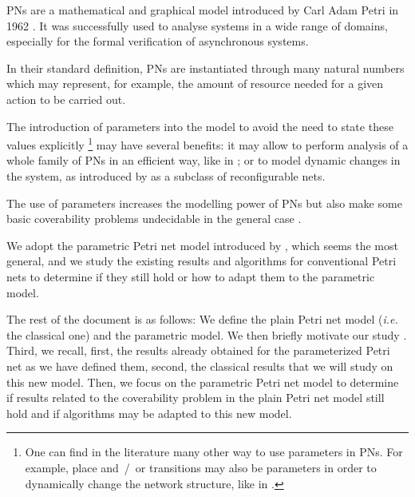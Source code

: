 \acp{PN} are a mathematical and graphical model introduced by Carl Adam Petri in 1962 \cite{Petri62}. It was successfully used to analyse systems in a wide range of domains, especially for the formal verification of asynchronous systems.

In their standard definition, \acp{PN} are instantiated through many natural numbers which may represent, for example, the amount of resource needed for a given action to be carried out.

The introduction of parameters into the model to avoid the need to state these values explicitly%
\footnote{One can find in the literature many other way to use parameters in \acp{PN}. For example, place and~/~or transitions may also be parameters in order to dynamically change the network structure, like in \cite{Christensen97}.}
may have several benefits:
it may allow to perform analysis of a whole family of \acp{PN} in an efficient way, like in \cite{Abdulla13}; or to model dynamic changes in the system, as introduced by \cite{Badouel99} as a subclass of reconfigurable nets.

The use of parameters increases the modelling power of \acp{PN} but also make some basic coverability problems undecidable in the general case \cite{David17}.

We adopt the parametric Petri net model introduced by \cite{David17}, which seems the most general, and we study the existing results and algorithms for conventional Petri nets to determine if they still hold or how to adapt them to the parametric model.

The rest of the document is as follows:
We define the plain Petri net model (\textit{i.e.} the classical one) and the parametric model.
We then briefly motivate our study .
Third, we recall, first, the results already obtained for the parameterized Petri net as we have defined them, second, the classical results that we will study on this new model.
Then, we focus on the parametric Petri net model to determine if results related to the coverability problem in the plain Petri net model still hold and if algorithms may be adapted to this new model.

